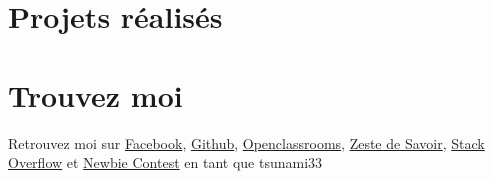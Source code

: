 \documentclass[11pt,a4paper]{moderncv}
\begin{document}
\section{Projets réalisés}

\section{Trouvez moi}
Retrouvez moi sur \href{https://facebook.com/tsunami33}{Facebook}, \href{https://github.com/tsunami33}{Github}, \href{http://openclassrooms.com/membres/tsunami33-10376}{Openclassrooms}, \href{https://zestedesavoir.com/membres/voir/tsunami33}{Zeste de Savoir}, \href{https://stackoverflow.com/users/3604143/tsunami33}{Stack Overflow} et \href{http://www.newbiecontest.org/index.php?page=classementdynamique&member=tsunami33}{Newbie Contest} en tant que tsunami33
\end{document}
